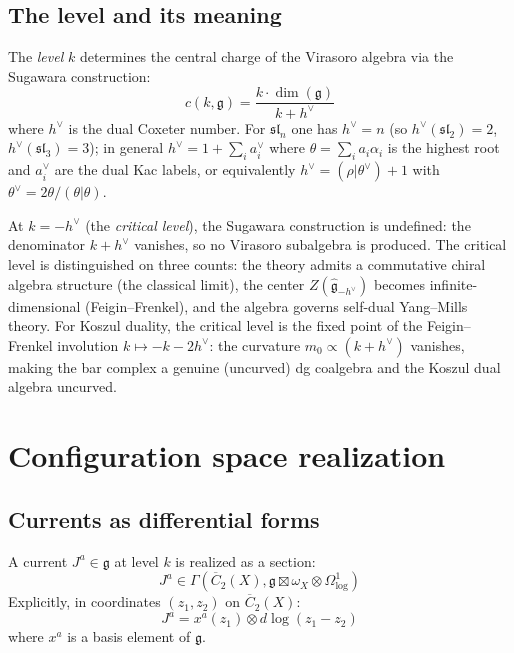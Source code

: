 \subsection{The level and its meaning}

\begin{definition}
The \emph{level} $k$ determines the central charge of the Virasoro algebra via the Sugawara construction:
\begin{equation}
c(k, \mathfrak{g}) = \frac{k \cdot \dim(\mathfrak{g})}{k + h^\vee}
\end{equation}
where $h^\vee$ is the dual Coxeter number.  For $\mathfrak{sl}_n$ one has $h^\vee = n$ (so $h^\vee(\mathfrak{sl}_2) = 2$, $h^\vee(\mathfrak{sl}_3) = 3$); in general $h^\vee = 1 + \sum_i a_i^\vee$ where $\theta = \sum_i a_i \alpha_i$ is the highest root and $a_i^\vee$ are the dual Kac labels, or equivalently $h^\vee = (\rho|\theta^\vee) + 1$ with $\theta^\vee = 2\theta/(\theta|\theta)$.
\end{definition}

\begin{remark}
At $k = -h^\vee$ (the \emph{critical level}), the Sugawara construction is undefined: the denominator $k + h^\vee$ vanishes, so no Virasoro subalgebra is produced.  The critical level is distinguished on three counts: the theory admits a commutative chiral algebra structure (the classical limit), the center $Z(\widehat{\mathfrak{g}}_{-h^\vee})$ becomes infinite-dimensional (Feigin--Frenkel), and the algebra governs self-dual Yang--Mills theory.  For Koszul duality, the critical level is the fixed point of the Feigin--Frenkel involution $k \mapsto -k - 2h^\vee$: the curvature $m_0 \propto (k + h^\vee)$ vanishes, making the bar complex a genuine (uncurved) dg coalgebra and the Koszul dual algebra uncurved.
\end{remark}

\section{Configuration space realization}

\subsection{Currents as differential forms}

\begin{construction}
A current $J^a \in \mathfrak{g}$ at level $k$ is realized as a section:
\begin{equation}
J^a \in \Gamma(\overline{C}_2(X), \mathfrak{g} \boxtimes \omega_X \otimes \Omega^1_{\log})
\end{equation}
Explicitly, in coordinates $(z_1, z_2)$ on $\overline{C}_2(X)$:
\begin{equation}
J^a = x^a(z_1) \otimes d\log(z_1-z_2)
\end{equation}
where $x^a$ is a basis element of $\mathfrak{g}$.
\end{construction}

